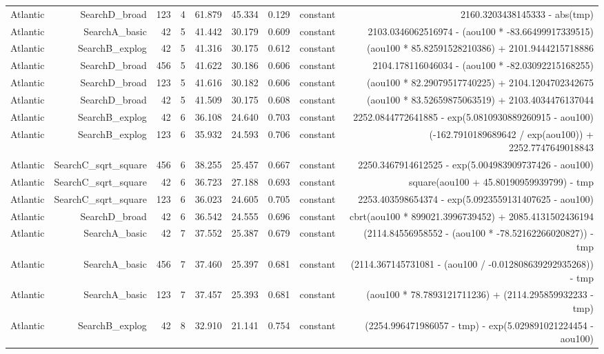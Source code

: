 \begin{table}
{\begin{tabular}{lrrrrrrrr}
Atlantic & SearchD\_broad & 123 & 4 & 61.879 & 45.334 & 0.129 & constant & 2160.3203438145333 - abs(tmp) \\
Atlantic & SearchA\_basic & 42 & 5 & 41.442 & 30.179 & 0.609 & constant & 2103.0346062516974 - (aou100 * -83.66499917339515) \\
Atlantic & SearchB\_explog & 42 & 5 & 41.316 & 30.175 & 0.612 & constant & (aou100 * 85.82591528210386) + 2101.9444215718886 \\
Atlantic & SearchD\_broad & 456 & 5 & 41.622 & 30.186 & 0.606 & constant & 2104.178116046034 - (aou100 * -82.03092215168255) \\
Atlantic & SearchD\_broad & 123 & 5 & 41.616 & 30.182 & 0.606 & constant & (aou100 * 82.29079517740225) + 2104.1204702342675 \\
Atlantic & SearchD\_broad & 42 & 5 & 41.509 & 30.175 & 0.608 & constant & (aou100 * 83.52659875063519) + 2103.4034476137044 \\
Atlantic & SearchB\_explog & 42 & 6 & 36.108 & 24.640 & 0.703 & constant & 2252.0844772641885 - exp(5.0810930889260915 - aou100) \\
Atlantic & SearchB\_explog & 123 & 6 & 35.932 & 24.593 & 0.706 & constant & (-162.7910189689642 / exp(aou100)) + 2252.7747649018843 \\
Atlantic & SearchC\_sqrt\_square & 456 & 6 & 38.255 & 25.457 & 0.667 & constant & 2250.3467914612525 - exp(5.004983909737426 - aou100) \\
Atlantic & SearchC\_sqrt\_square & 42 & 6 & 36.723 & 27.188 & 0.693 & constant & square(aou100 + 45.80190959939799) - tmp \\
Atlantic & SearchC\_sqrt\_square & 123 & 6 & 36.023 & 24.605 & 0.705 & constant & 2253.403598654374 - exp(5.0923559131407625 - aou100) \\
Atlantic & SearchD\_broad & 42 & 6 & 36.542 & 24.555 & 0.696 & constant & cbrt(aou100 * 899021.3996739452) + 2085.4131502436194 \\
Atlantic & SearchA\_basic & 42 & 7 & 37.552 & 25.387 & 0.679 & constant & (2114.84556958552 - (aou100 * -78.52162266020827)) - tmp \\
Atlantic & SearchA\_basic & 456 & 7 & 37.460 & 25.397 & 0.681 & constant & (2114.367145731081 - (aou100 / -0.012808639292935268)) - tmp \\
Atlantic & SearchA\_basic & 123 & 7 & 37.457 & 25.393 & 0.681 & constant & (aou100 * 78.7893121711236) + (2114.295859932233 - tmp) \\
Atlantic & SearchB\_explog & 42 & 8 & 32.910 & 21.141 & 0.754 & constant & (2254.996471986057 - tmp) - exp(5.029891021224454 - aou100) \\

\end{tabular}}
\end{table}
